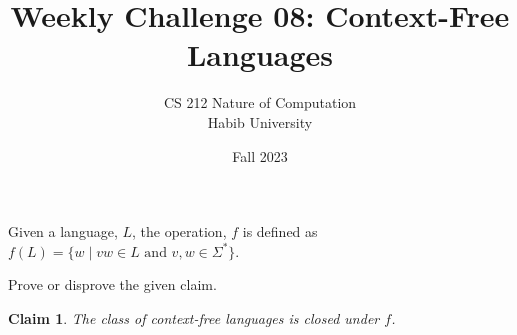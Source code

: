 \documentclass[a4paper]{exam}
\title{Weekly Challenge 08: Context-Free Languages}
\author{CS 212 Nature of Computation\\Habib University}
\date{Fall 2023}
\theoremstyle{theorem}
\theoremstyle{claim}
\newtheorem{claim}{Claim}
\begin{document}
\maketitle

\begin{questions}


  Given a language, $L$, the operation, $f$ is defined as $f(L) = \{w\mid vw \in L \text{ and } v,w\in\Sigma^*\}$.

  Prove or disprove the given claim.

  \begin{claim}
    The class of context-free languages is closed under $f$.
  \end{claim}

  \begin{solution}
    
  \end{solution}
  
\end{questions}
\end{document}

